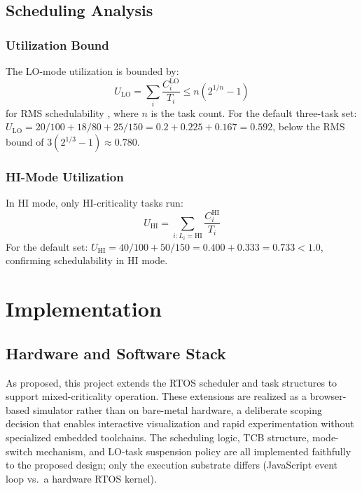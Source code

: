 \documentclass[conference]{IEEEtran}
\begin{document}
\subsection{Scheduling Analysis}

\subsubsection{Utilization Bound}
The LO-mode utilization is bounded by:
\begin{equation}
  U_{\text{LO}} = \sum_{i} \frac{C_i^{\text{LO}}}{T_i} \leq n(2^{1/n} - 1)
  \label{eq:rms}
\end{equation}
for RMS schedulability \cite{liu1973scheduling}, where $n$ is the task count. For the default three-task set: $U_{\text{LO}} = 20/100 + 18/80 + 25/150 = 0.2 + 0.225 + 0.167 = 0.592$, below the RMS bound of $3(2^{1/3}-1) \approx 0.780$.

\subsubsection{HI-Mode Utilization}
In HI mode, only HI-criticality tasks run:
\begin{equation}
  U_{\text{HI}} = \sum_{i: L_i=\text{HI}} \frac{C_i^{\text{HI}}}{T_i}
  \label{eq:hiutil}
\end{equation}
For the default set: $U_{\text{HI}} = 40/100 + 50/150 = 0.400 + 0.333 = 0.733 < 1.0$, confirming schedulability in HI mode.

\section{Implementation}

\subsection{Hardware and Software Stack}
As proposed, this project extends the RTOS scheduler and task structures to support mixed-criticality operation. These extensions are realized as a browser-based simulator rather than on bare-metal hardware, a deliberate scoping decision that enables interactive visualization and rapid experimentation without specialized embedded toolchains. The scheduling logic, TCB structure, mode-switch mechanism, and LO-task suspension policy are all implemented faithfully to the proposed design; only the execution substrate differs (JavaScript event loop vs.\ a hardware RTOS kernel).
\end{document}
